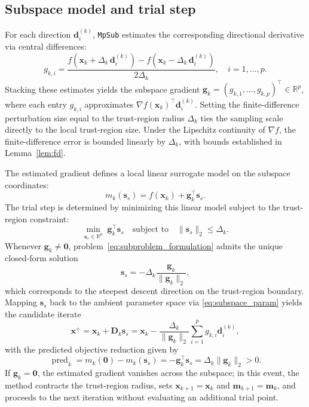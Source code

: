 \documentclass{siamart171218}
\newcommand{\bx}{\bm{x}}
\newcommand{\bd}{\bm{d}}
\newcommand{\bg}{\bm{g}}
\newcommand{\bs}{\bm{s}}
\begin{document}
\subsection{Subspace model and trial step}
\label{subsec:gradient}
\label{subsec:trial}

For each direction $\bd_i^{(k)}$, \texttt{MpSub} estimates the corresponding directional derivative via central differences:
\begin{equation}
g_{k,i} = \frac{f(\bx_k + \Delta_k \, \bd_i^{(k)}) - f(\bx_k - \Delta_k \, \bd_i^{(k)})}{2\Delta_k}, \quad i = 1, \ldots, p.
\label{eq:central_diff}
\end{equation}
Stacking these estimates yields the subspace gradient $\bg_k = (g_{k,1}, \ldots, g_{k,p})^\top \in \mathbb{R}^p$, where each entry $g_{k,i}$ approximates $\nabla f(\bx_k)^\top \bd_i^{(k)}$. Setting the finite-difference perturbation size equal to the trust-region radius $\Delta_k$ ties the sampling scale directly to the local trust-region size. Under the Lipschitz continuity of $\nabla f$, the finite-difference error is bounded linearly by $\Delta_k$, with bounds established in Lemma~\ref{lem:fd}.

The estimated gradient defines a local linear surrogate model on the subspace coordinates:
\begin{equation}
m_k(\bs_s) = f(\bx_k) + \bg_k^\top \bs_s.
\label{eq:linear_model}
\end{equation}
The trial step is determined by minimizing this linear model subject to the trust-region constraint:
\begin{equation}
\min_{\bs_s \in \mathbb{R}^p}\; \bg_k^\top \bs_s \quad \text{subject to} \quad \|\bs_s\|_2 \leq \Delta_k.
\label{eq:subproblem_formulation}
\end{equation}
Whenever $\bg_k \ne \bm 0$, problem~\eqref{eq:subproblem_formulation} admits the unique closed-form solution
\begin{equation}
\bs_s = -\Delta_k \frac{\bg_k}{\|\bg_k\|_2},
\label{eq:closed_form_step}
\end{equation}
which corresponds to the steepest descent direction on the trust-region boundary. Mapping $\bs_s$ back to the ambient parameter space via \eqref{eq:subspace_param} yields the candidate iterate
\begin{equation}
\bx^+ = \bx_k + \bm D_k \bs_s = \bx_k - \frac{\Delta_k}{\|\bg_k\|_2} \sum_{i=1}^p g_{k,i} \bd_i^{(k)},
\label{eq:full_trial_point}
\end{equation}
with the predicted objective reduction given by
\begin{equation}
\operatorname{pred}_k = m_k(\bm 0) - m_k(\bs_s) = -\bg_k^\top \bs_s = \Delta_k \|\bg_k\|_2 > 0.
\label{eq:pred_reduction}
\end{equation}
If $\bg_k = \bm 0$, the estimated gradient vanishes across the subspace; in this event, the method contracts the trust-region radius, sets $\bx_{k+1} = \bx_k$ and $\bm m_{k+1} = \bm m_k$, and proceeds to the next iteration without evaluating an additional trial point.
\end{document}
